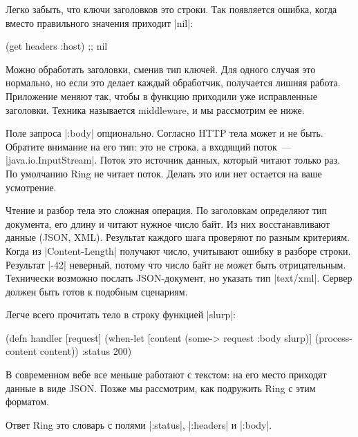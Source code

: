 Легко забыть, что ключи заголовков это строки. Так появляется ошибка, когда
вместо правильного значения приходит \spverb|nil|:

\begin{english}
  \begin{clojure}
(get headers :host) ;; nil
  \end{clojure}
\end{english}

Можно обработать заголовки, сменив тип ключей. Для одного случая это
нормально, но если это делает каждый обработчик, получается лишняя
работа. Приложение меняют так, чтобы в функцию приходили уже исправленные
заголовки. Техника называется middleware, и мы рассмотрим ее ниже.

Поле запроса \spverb|:body| опционально. Согласно HTTP тела может и не
быть. Обратите внимание на его тип: это не строка, а входящий поток~---
\spverb|java.io.InputStream|. Поток это источник данных, который читают только
раз. По умолчанию Ring не читает поток. Делать это или нет остается на ваше
усмотрение.

Чтение и разбор тела это сложная операция. По заголовкам определяют тип
документа, его длину и читают нужное число байт. Из них восстанавливают данные
(JSON, XML). Результат каждого шага проверяют по разным критериям. Когда из
\spverb|Content-Length| получают число, учитывают ошибку в разборе
строки. Результат \spverb|-42| неверный, потому что число байт не может быть
отрицательным. Технически возможно послать JSON-документ, но указать тип
\spverb|text/xml|. Сервер должен быть готов к подобным сценариям.

Легче всего прочитать тело в строку функцией \spverb|slurp|:

\begin{english}
  \begin{clojure}
(defn handler [request]
  (when-let [content (some-> request :body slurp)]
    (process-content content))
  {:status 200})
  \end{clojure}
\end{english}

В современном вебе все меньше работают с текстом: на его место приходят данные в
виде JSON. Позже мы рассмотрим, как подружить Ring с этим форматом.

Ответ Ring это словарь с полями \spverb|:status|, \spverb|:headers| и
\spverb|:body|.


